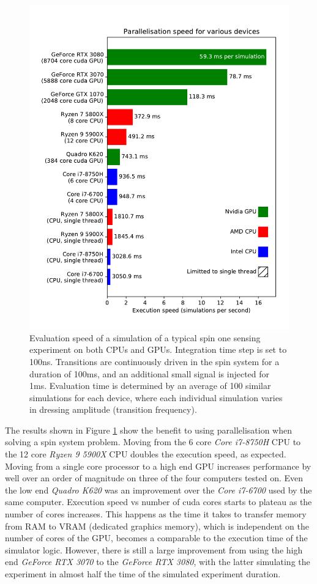 \documentclass{jors}
\begin{document}
		\begin{figure}[htbp!]
			\centering
			\includegraphics[scale=0.7]{benchmark_device_aggregate.pdf}
			\caption{Evaluation speed of a simulation of a typical spin one sensing experiment on both CPUs and GPUs. Integration time step is set to 100ns. Transitions are continuously driven in the spin system for a duration of 100ms, and an additional small signal is injected for 1ms. Evaluation time is determined by an average of 100 similar simulations for each device, where each individual simulation varies in dressing amplitude (transition frequency).}
			\label{fig:benchmark_device_aggregate}
		\end{figure}

		The results shown in Figure \ref{fig:benchmark_device_aggregate} show the benefit to using parallelisation when solving a spin system problem. Moving from the 6 core \emph{Core i7-8750H} CPU to the 12 core \emph{Ryzen 9 5900X} CPU doubles the execution speed, as expected. Moving from a single core processor to a high end GPU increases performance by well over an order of magnitude on three of the four computers tested on. Even the low end \emph{Quadro K620} was an improvement over the \emph{Core i7-6700} used by the same computer. Execution speed vs number of cuda cores starts to plateau as the number of cores increases. This happens as the time it takes to transfer memory from RAM to VRAM (dedicated graphics memory), which is independent on the number of cores of the GPU, becomes a comparable to the execution time of the simulator logic. However, there is still a large improvement from using the high end \emph{GeForce RTX 3070} to the \emph{GeForce RTX 3080}, with the latter simulating the experiment in almost half the time of the simulated experiment duration.
\end{document}
